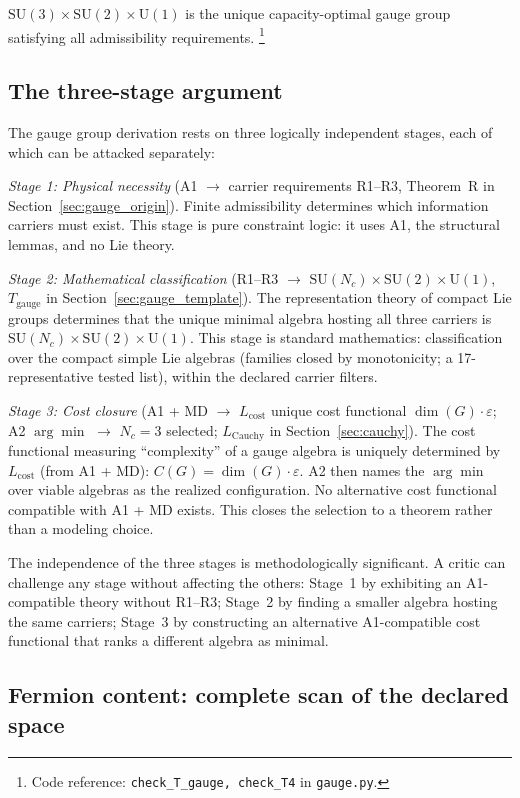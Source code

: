 \documentclass[11pt]{article}
\newcommand{\coderef}[2]{\footnote{Code reference: \texttt{#1} in \texttt{#2}.}}
\newcommand{\SU}{\mathrm{SU}}
\newcommand{\U}{\mathrm{U}}
\begin{document}
$\SU(3) \times \SU(2) \times \U(1)$ is the unique capacity-optimal gauge group satisfying all admissibility requirements.
\coderef{check\_T\_gauge, check\_T4}{gauge.py}

\subsection{The three-stage argument}

The gauge group derivation rests on three logically independent stages, each of which can be attacked separately:

\textit{Stage 1: Physical necessity} (A1 $\to$ carrier requirements R1--R3, Theorem~R in Section~\ref{sec:gauge_origin}).  Finite admissibility determines which information carriers must exist.  This stage is pure constraint logic: it uses A1, the structural lemmas, and no Lie theory.

\textit{Stage 2: Mathematical classification} (R1--R3 $\to$ $\SU(N_c) \times \SU(2) \times \U(1)$, $T_{\mathrm{gauge}}$ in Section~\ref{sec:gauge_template}).  The representation theory of compact Lie groups determines that the unique minimal algebra hosting all three carriers is $\SU(N_c) \times \SU(2) \times \U(1)$.  This stage is standard mathematics: classification over the compact simple Lie algebras (families closed by monotonicity; a 17-representative tested list), within the declared carrier filters.

\textit{Stage 3: Cost closure} (A1 + MD $\to$ $L_{\mathrm{cost}}$ unique cost functional $\dim(G) \cdot \varepsilon$; A2 $\arg\min$ $\to$ $N_c = 3$ selected; $L_{\mathrm{Cauchy}}$ in Section~\ref{sec:cauchy}).  The cost functional measuring ``complexity'' of a gauge algebra is uniquely determined by $L_{\mathrm{cost}}$ (from A1 + MD): $C(G) = \dim(G) \cdot \varepsilon$.  A2 then names the $\arg\min$ over viable algebras as the realized configuration.  No alternative cost functional compatible with A1 + MD exists.  This closes the selection to a theorem rather than a modeling choice.

The independence of the three stages is methodologically significant.  A critic can challenge any stage without affecting the others: Stage~1 by exhibiting an A1-compatible theory without R1--R3; Stage~2 by finding a smaller algebra hosting the same carriers; Stage~3 by constructing an alternative A1-compatible cost functional that ranks a different algebra as minimal.

\subsection{Fermion content: complete scan of the declared space}
\end{document}
